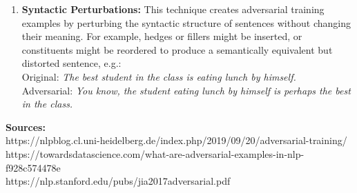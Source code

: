 \begin{exercise}
\begin{enumerate}
    \item \textbf{Syntactic Perturbations:} This technique creates adversarial training examples by perturbing the syntactic structure of sentences without changing their meaning. For example, hedges or fillers might be inserted, or constituents might be reordered to produce a semantically equivalent but distorted sentence, e.g.: \\
    Original: \textit{The best student in the class is eating lunch by himself.} \\
    Adversarial: \textit{You know, the student eating lunch by himself is perhaps the best in the class.}
    

\end{enumerate}
\textbf{Sources:}\\
https://nlpblog.cl.uni-heidelberg.de/index.php/2019/09/20/adversarial-training/
\\
https://towardsdatascience.com/what-are-adversarial-examples-in-nlp-f928c574478e
\\
https://nlp.stanford.edu/pubs/jia2017adversarial.pdf
\end{exercise}


